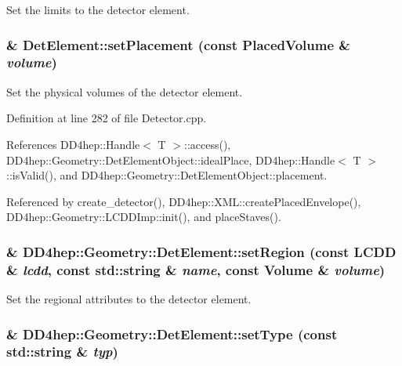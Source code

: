 Set the limits to the detector element. \hypertarget{class_d_d4hep_1_1_geometry_1_1_det_element_a18640f84168adced73afd4eb2b84a798}{
\subsubsection[{setPlacement}]{ \& DetElement::setPlacement (const {\bf PlacedVolume} \& {\em volume})}}
\label{class_d_d4hep_1_1_geometry_1_1_det_element_a18640f84168adced73afd4eb2b84a798}


Set the physical volumes of the detector element. 

Definition at line 282 of file Detector.cpp.

References DD4hep::Handle$<$ T $>$::access(), DD4hep::Geometry::DetElementObject::idealPlace, DD4hep::Handle$<$ T $>$::isValid(), and DD4hep::Geometry::DetElementObject::placement.

Referenced by create\_\-detector(), DD4hep::XML::createPlacedEnvelope(), DD4hep::Geometry::LCDDImp::init(), and placeStaves().\hypertarget{class_d_d4hep_1_1_geometry_1_1_det_element_a428b67df7bca888c0b08e49a0de0eb37}{
\subsubsection[{setRegion}]{\& DD4hep::Geometry::DetElement::setRegion (const {\bf LCDD} \& {\em lcdd}, \/  const std::string \& {\em name}, \/  const {\bf Volume} \& {\em volume})}}
\label{class_d_d4hep_1_1_geometry_1_1_det_element_a428b67df7bca888c0b08e49a0de0eb37}


Set the regional attributes to the detector element. \hypertarget{class_d_d4hep_1_1_geometry_1_1_det_element_a28c2c203dfcb6cd893bbe1bec4101392}{
\subsubsection[{setType}]{\& DD4hep::Geometry::DetElement::setType (const std::string \& {\em typ})}}
\label{class_d_d4hep_1_1_geometry_1_1_det_element_a28c2c203dfcb6cd893bbe1bec4101392}


